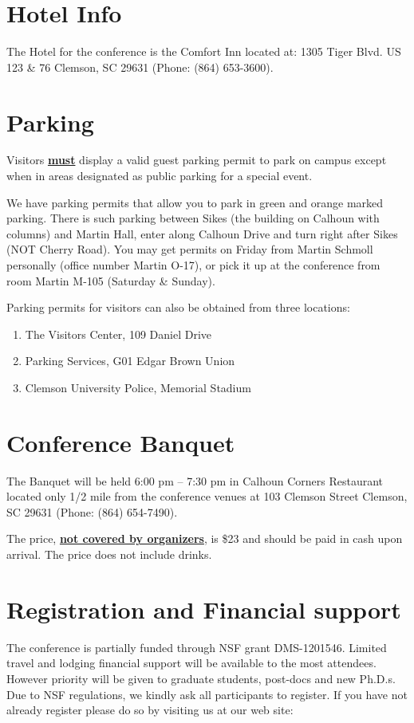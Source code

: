 \documentclass[a4paper,10pt,foldmark]{leaflet}
\begin{document}
\section{Hotel Info}
The Hotel for the conference is the Comfort Inn located at:
1305 Tiger Blvd.
US 123 \& 76
Clemson, SC 29631
(Phone: (864) 653-3600).

\section{Parking}
Visitors \underline{\bf must} display a valid guest parking permit to
park on campus except when in areas designated as public parking for a
special event.


We have parking permits that allow you to park in green and orange
marked parking. There is such parking between Sikes (the building on
Calhoun with columns) and Martin Hall, enter along Calhoun Drive and
turn right after Sikes (NOT Cherry Road). You may get permits on Friday
from Martin Schmoll personally (office number Martin O-17), or pick it
up at the conference from room Martin M-105 (Saturday \& Sunday).


Parking permits for visitors can also be obtained from three locations:
\begin{enumerate}
\item The Visitors Center, 109 Daniel Drive
\item Parking Services, G01 Edgar Brown Union
\item Clemson University Police, Memorial
Stadium
\end{enumerate}
\section{Conference Banquet}
The Banquet will be held 6:00 pm -- 7:30 pm in Calhoun Corners
Restaurant located only 1/2 mile from the conference venues at
103 Clemson Street
Clemson, SC 29631
(Phone: (864) 654-7490).


The price, \underline{\bf not covered by organizers}, is \$23 and should
be paid in cash upon arrival. The price does not include drinks.



\section{Registration and Financial support} The
conference is partially funded through NSF grant DMS-1201546.  Limited
travel and lodging financial support will be available to the most
attendees. However priority will be given to graduate students,
post-docs and new Ph.D.s. Due to NSF regulations, we kindly ask all
participants to register. If you have not already register please do so
by visiting us at our web site:
\end{document}
